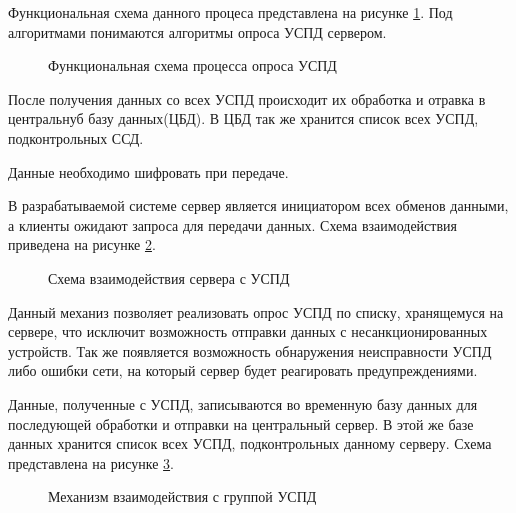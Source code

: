 Функциональная схема данного процеса представлена на рисунке \ref{img:main_idef0}. Под алгоритмами понимаются алгоритмы опроса УСПД сервером.

\begin{figure}[!Ht]
 \caption{Функциональная схема процесса опроса УСПД}
 \label{img:main_idef0}
\end{figure}

После получения данных со всех УСПД происходит их обработка и отравка в центральнуб базу данных(ЦБД). В ЦБД так же хранится список всех УСПД, подконтрольных ССД.

Данные необходимо шифровать при передаче.

В разрабатываемой системе сервер является инициатором всех обменов данными, а клиенты ожидают запроса для передачи данных. Схема взаимодействия приведена на рисунке \ref{scheme2:scheme2}.

\begin{figure}[!ht]
 \caption{Схема взаимодействия сервера с УСПД}
 \label{scheme2:scheme2}
\end{figure}

Данный механиз позволяет реализовать опрос УСПД по списку, хранящемуся на сервере, что исключит возможность отправки данных с несанкционированных устройств. Так же появляется возможность обнаружения неисправности УСПД либо ошибки сети, на который сервер будет реагировать предупреждениями. 

Данные, полученные с УСПД, записываются во временную базу данных для последующей обработки и отправки на центральный сервер. В этой же базе данных хранится список всех УСПД, подконтрольных данному серверу. Схема представлена на рисунке \ref{scheme3:scheme3}.

\begin{figure}[!ht]
 \caption{Механизм взаимодействия с группой УСПД}
 \label{scheme3:scheme3}
\end{figure}

